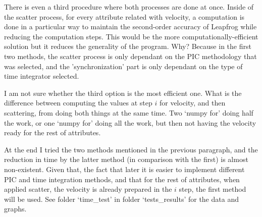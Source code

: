 \documentclass[reprint,aps]{revtex4-1}
\begin{document}
There is even a third procedure where both processes are done at once. Inside of the scatter process, for every attribute related with velocity, a computation is done in a particular way to maintain the second-order accuracy of Leapfrog while reducing the computation steps. This would be the more computationally-efficient solution but it reduces the generality of the program. Why? Because in the first two methods, the scatter process is only dependant on the PIC methodology that was selected, and the 'synchronization' part is only dependant on the type of time integrator selected.

I am not sure whether the third option is the most efficient one. What is the difference between computing the values at step $i$ for velocity, and then scattering, from doing both things at the same time. Two `numpy for' doing half the work, or one `numpy for' doing all the work, but then not having the velocity ready for the rest of attributes. 

At the end I tried the two methods mentioned in the previous paragraph, and the reduction in time by the latter method (in comparison with the first) is almost non-existent. Given that, the fact that later it is easier to implement different PIC and time integration methods, and that for the rest of attributes, when applied scatter, the velocity is already prepared in the $i$ step, the first method will be used. See folder `time\_test' in folder `tests\_results' for the data and graphs.
\end{document}
